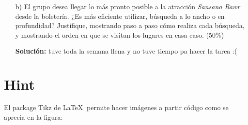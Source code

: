 \documentclass[letterpaper,10pt]{article}
\begin{document}
\begin{enumerate}
\begin{itemize}
\begin{center}
\begin{minipage}{0.9\textwidth}
                \label{sol3}
                \end{minipage}
            \end{center}
            
        \item[b) ]El grupo desea llegar lo más pronto posible a la atracción \textit{Sansano Rawr} desde la boletería. ¿Es más eficiente utilizar, búsqueda a lo ancho o en profundidad? Justifique, mostrando paso a paso cómo realiza cada búsqueda, y mostrando el orden en que se visitan los lugares en casa caso. (50\%)
        
        \textbf{Solución:}
        \newline
        tuve toda la semana llena y no tuve tiempo pa hacer la tarea :(
        
    \end{itemize}


\end{enumerate}


\newpage

\section*{Hint}

El package Tikz de \LaTeX $~$ permite hacer imágenes a partir código como se aprecia en la figura:

\begin{center}
    \begin{minipage}{0.32\textwidth}
    \centering
    \label{gra2}
    \end{minipage}
\end{center}
\end{document}
